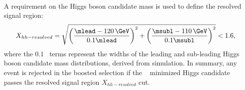 \paragraph{}
A requirement on the Higgs boson candidate mass is used to define the resolved signal region:
\begin{equation}
X_{hh-resolved} = \sqrt{\left(\frac{\mlead - 120\,\GeV}{0.1\mlead}\right)^2 + \left(\frac{\msubl - 110\,\GeV}{0.1\msubl}\right)^2} < 1.6,
\label{eqn:resolvedXhh}
\end{equation}
where the $0.1$\mtwoj~ terms represent the widths of the leading and sub-leading Higgs boson candidate mass distributions, derived from simulation.
In summary, any event is rejected in the boosted selection if the \Dhh~ minimized Higgs candidate passes the resolved signal region $X_{hh-resolved}$ cut.



